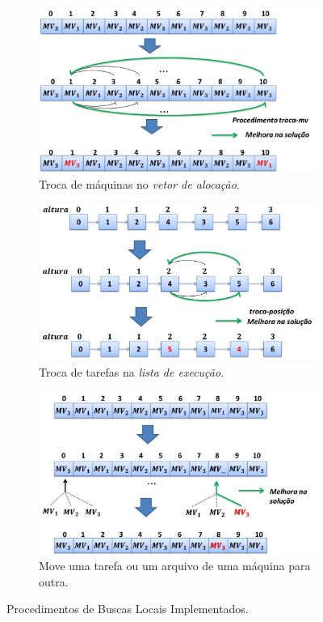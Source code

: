 \begin{figure}[H]
\centering
\begin{subfigure}[t]{.5\textwidth}
  \centering
  \includegraphics[width=1\linewidth]{figure/swap_vm.jpg}
  \caption{Troca de máquinas no \textit{vetor de alocação}.}
  \label{fig:swapvm}
\end{subfigure}%
\begin{subfigure}[t]{.5\textwidth}
  \centering
  \includegraphics[width=1\linewidth]{figure/swap_sequence.jpg}
  \caption{Troca de tarefas na \textit{lista de execução}.}
  \label{fig:swapsequence}
\vspace{1\baselineskip}
\end{subfigure}
\begin{subfigure}{.5\textwidth}
  \centering
  \includegraphics[width=1\linewidth]{figure/move_element.jpg}
  \caption{Move uma tarefa ou um arquivo de uma máquina para outra.}
  \label{fig:move}
\end{subfigure}
\caption{Procedimentos de Buscas Locais Implementados.}
\label{fig:localSearch}
\end{figure}
